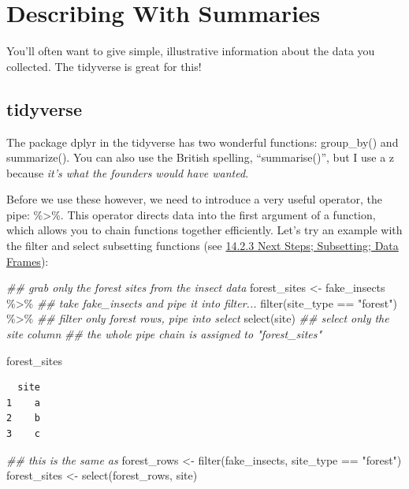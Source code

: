 \documentclass[
  letterpaper,
  DIV=11,
  numbers=noendperiod]{scrreprt}
\newenvironment{Shaded}{\begin{snugshade}}{\end{snugshade}}
\newcommand{\DocumentationTok}[1]{\textcolor[rgb]{0.37,0.37,0.37}{\textit{#1}}}
\newcommand{\FunctionTok}[1]{\textcolor[rgb]{0.28,0.35,0.67}{#1}}
\newcommand{\NormalTok}[1]{\textcolor[rgb]{0.00,0.23,0.31}{#1}}
\newcommand{\OtherTok}[1]{\textcolor[rgb]{0.00,0.23,0.31}{#1}}
\newcommand{\SpecialCharTok}[1]{\textcolor[rgb]{0.37,0.37,0.37}{#1}}
\newcommand{\StringTok}[1]{\textcolor[rgb]{0.13,0.47,0.30}{#1}}
\begin{document}
\section{Describing With Summaries}\label{describing-with-summaries}

You'll often want to give simple, illustrative information about the
data you collected. The tidyverse is great for this!

\subsection{tidyverse}\label{tidyverse-2}

The package dplyr in the tidyverse has two wonderful functions:
group\_by() and summarize(). You can also use the British spelling,
``summarise()'', but I use a z because \emph{it's what the founders
would have wanted}.

Before we use these however, we need to introduce a very useful
operator, the pipe: \%\textgreater\%. This operator directs data into
the first argument of a function, which allows you to chain functions
together efficiently. Let's try an example with the filter and select
subsetting functions (see \hyperref[sec-sub_data]{14.2.3 Next Steps;
Subsetting; Data Frames}):

\begin{Shaded}
\begin{Highlighting}[]
\DocumentationTok{\#\# grab only the forest sites from the insect data}
\NormalTok{forest\_sites }\OtherTok{\textless{}{-}}\NormalTok{ fake\_insects }\SpecialCharTok{\%\textgreater{}\%} \DocumentationTok{\#\# take fake\_insects and pipe it into filter...}
  \FunctionTok{filter}\NormalTok{(site\_type }\SpecialCharTok{==} \StringTok{"forest"}\NormalTok{) }\SpecialCharTok{\%\textgreater{}\%} \DocumentationTok{\#\# filter only forest rows, pipe into select}
  \FunctionTok{select}\NormalTok{(site) }\DocumentationTok{\#\# select only the site column}
\DocumentationTok{\#\# the whole pipe chain is assigned to "forest\_sites"}

\NormalTok{forest\_sites}
\end{Highlighting}
\end{Shaded}

\begin{verbatim}
  site
1    a
2    b
3    c
\end{verbatim}

\begin{Shaded}
\begin{Highlighting}[]
\DocumentationTok{\#\# this is the same as}
\NormalTok{forest\_rows }\OtherTok{\textless{}{-}} \FunctionTok{filter}\NormalTok{(fake\_insects, site\_type }\SpecialCharTok{==} \StringTok{"forest"}\NormalTok{)}
\NormalTok{forest\_sites }\OtherTok{\textless{}{-}} \FunctionTok{select}\NormalTok{(forest\_rows, site)}
\end{Highlighting}
\end{Shaded}
\end{document}
